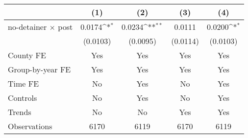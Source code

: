 {
\def\sym#1{\ifmmode^{#1}\else\(^{#1}\)\fi}
\begin{tabular}{l*{4}{c}}
\hline\hline
                    &\multicolumn{1}{c}{(1)}         &\multicolumn{1}{c}{(2)}         &\multicolumn{1}{c}{(3)}         &\multicolumn{1}{c}{(4)}         \\
\hline
no-detainer $\times$ post&      0.0174\sym{*}  &      0.0234\sym{**} &      0.0111         &      0.0200\sym{*}  \\
                    &    (0.0103)         &    (0.0095)         &    (0.0114)         &    (0.0103)         \\
[1em]
County FE           &         Yes         &         Yes         &         Yes         &         Yes         \\
[1em]
Group-by-year FE    &         Yes         &         Yes         &         Yes         &         Yes         \\
[1em]
Time FE             &          No         &         Yes         &          No         &         Yes         \\
[1em]
Controls            &          No         &         Yes         &          No         &         Yes         \\
[1em]
Trends              &          No         &          No         &         Yes         &         Yes         \\
\hline
Observations        &        6170         &        6119         &        6170         &        6119         \\
\hline\hline
\end{tabular}
}
